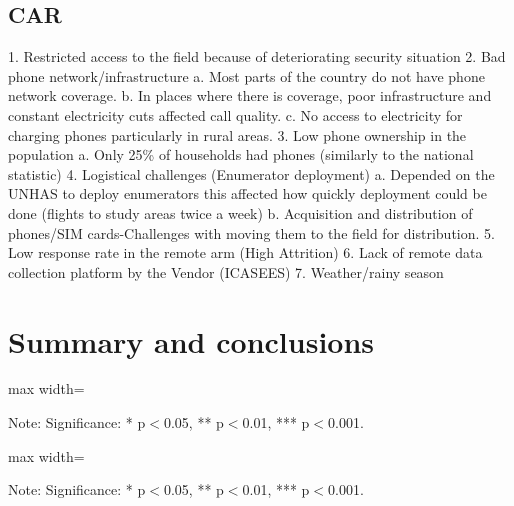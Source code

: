 \documentclass[11pt,harvard]{article}
\begin{document}
\subsection{CAR}

1.	Restricted access to the field because of deteriorating security situation
2.	Bad phone network/infrastructure 
		a.	Most parts of the country do not have phone network coverage.
		b.	In places where there is coverage, poor infrastructure and constant electricity cuts affected call quality.
		c.	No access to electricity for charging phones particularly in rural areas.
3.	Low phone ownership in the population
		a.	Only 25\% of households had phones (similarly to the national statistic)
4.	Logistical challenges (Enumerator deployment)
		a.	Depended on the UNHAS to deploy enumerators this affected how quickly deployment could be done (flights to study areas twice a week)
		b.	Acquisition and distribution of phones/SIM cards-Challenges with moving them to the field for distribution.
5.	Low response rate in the remote arm (High Attrition)
6.	Lack of remote data collection platform by the Vendor (ICASEES) 
7.	Weather/rainy season

\pagebreak

\section{Summary and conclusions}

	\begin{table}[htbp]
	\centering
	\begin{adjustbox}{max width=\textwidth}
		\begin{threeparttable}
			\caption{Impact of Survey Modality on Food Consumption Score and Groups}
			\scriptsize
			 
			\label{tab:FCS_Modality_All_Country_Short}
			\begin{tablenotes}
				\item Note: Significance: * p$<$0.05, ** p$<$0.01, *** p$<$0.001. 
			\end{tablenotes}
		\end{threeparttable}
	\end{adjustbox}
\end{table}


	\begin{table}[htbp]
	\centering
	\begin{adjustbox}{max width=\textwidth}
		\begin{threeparttable}
			\caption{Myanmar Sample Balance Table}
			\scriptsize
			 
			\label{tab:Myanmar_Modality_Demo_Balance}
			\begin{tablenotes}
				\item Note: Significance: * p$<$0.05, ** p$<$0.01, *** p$<$0.001. 
			\end{tablenotes}
		\end{threeparttable}
	\end{adjustbox}
\end{table}
\end{document}
